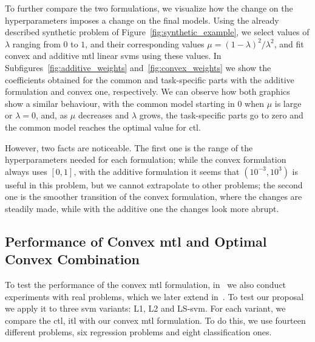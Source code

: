 %
To further compare the two formulations, we visualize how the change on the hyperparameters imposes a change on the final models. Using the already described synthetic problem of Figure~\ref{fig:synthetic_example}, we select values of $\lambda$ ranging from $0$ to $1$, and their corresponding values $\mu = (1-\lambda)^2 / \lambda^2$, and fit convex and additive \acrshort{mtl} linear \acrshort{svm}s using these values. In Subfigures~\ref{fig:additive_weights} and~\ref{fig:convex_weights} we show the coefficients obtained for the common and task-specific parts with the additive formulation and convex one, respectively.
%
We can observe how both graphics show a similar behaviour, with the common model starting in $0$ when $\mu$ is large or $\lambda=0$, and, as $\mu$ decreases and $\lambda$ grows, the task-specific parts go to zero and the common model reaches the optimal value for \acrshort{ctl}.
%

However, two facts are noticeable. The first one is the range of the hyperparameters needed for each formulation; while the convex formulation always uses $[0, 1]$, with the additive formulation it seems that $(10^{-3}, 10^3)$ is useful in this problem, but we cannot extrapolate to other problems; the second one is the smoother transition of the convex formulation, where the changes are steadily made, while with the additive one the changes look more abrupt.



\subsection{Performance of Convex \acrshort{mtl} and Optimal Convex Combination}

To test the performance of the convex \acrshort{mtl} formulation, in~\citet{RuizAD19} we also conduct experiments with real problems, which we later extend in~\citet{RuizAD21}. 
To test our proposal we apply it to three \acrshort{svm} variants: L1, L2 and LS-\acrshort{svm}. For each variant, we compare the \acrshort{ctl}, \acrshort{itl} with our convex \acrshort{mtl} formulation. To do this, we use fourteen different problems, six regression problems and eight classification ones.

